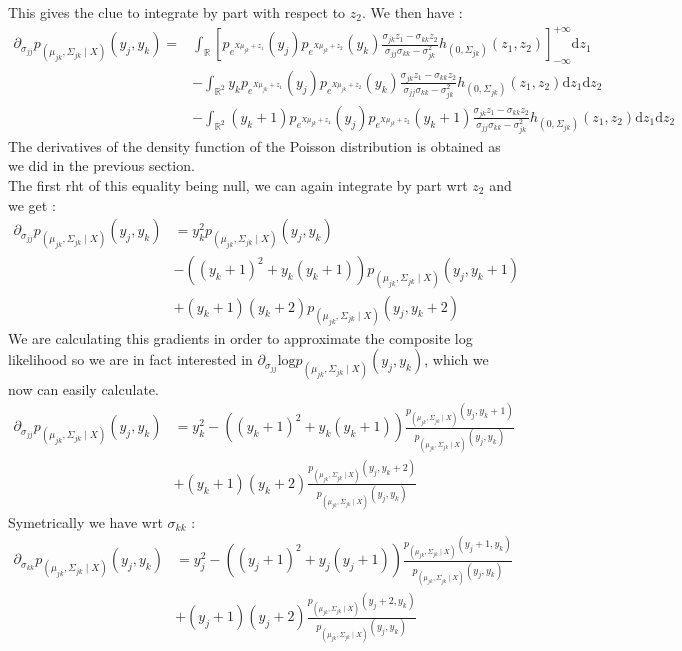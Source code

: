 \documentclass[11pt, a4paper]{article}
\begin{document}
This gives the clue to integrate by part with respect to $z_2$. We then have :
\begin{align*}
\partial_{\sigma_{jj}} p_{(\mu_{jk},\Sigma_{jk} \mid X)}(y_j,y_k) =& \int_{\mathbb{R}} [  p_{e^{X\mu_{jk}+z_1}}(y_j) p_{e^{X\mu_{jk}+z_2}}(y_k) \frac{\sigma_{jk} z_1 - \sigma_{kk} z_2}{\sigma_{jj} \sigma_{kk}-\sigma_{jk}^2} h_{(0,\Sigma_{jk})}(z_1,z_2) ]_{- \infty}^{+\infty} \mathrm{d}z_1\\
 &- \int_{\mathbb{R}^2} y_k p_{e^{X\mu_{jk}+z_1}}(y_j) p_{e^{X\mu_{jk}+z_2}}(y_k) \frac{\sigma_{jk} z_1 - \sigma_{kk} z_2}{\sigma_{jj} \sigma_{kk}-\sigma_{jk}^2} h_{(0,\Sigma_{jk})}(z_1,z_2) \mathrm{d}z_1 \mathrm{d}z_2\\
 &- \int_{\mathbb{R}^2} (y_k+1) p_{e^{X\mu_{jk}+z_1}}(y_j)  p_{e^{X\mu_{jk}+z_2}}(y_k+1) \frac{\sigma_{jk} z_1 - \sigma_{kk} z_2}{\sigma_{jj} \sigma_{kk}-\sigma_{jk}^2} h_{(0,\Sigma_{jk})}(z_1,z_2) \mathrm{d}z_1 \mathrm{d}z_2
\end{align*}
The derivatives of the density function of the Poisson distribution is obtained as we did in the previous section.\\
The first rht of this equality being null, we can again integrate by part wrt $z_2$ and we get :
\begin{align*}
\partial_{\sigma_{jj}} p_{(\mu_{jk},\Sigma_{jk} \mid X)}(y_j,y_k) &= y_k^2 p_{(\mu_{jk},\Sigma_{jk} \mid X)}(y_j,y_k)\\
& - ((y_k+1)^2 + y_k (y_k+1) ) p_{(\mu_{jk},\Sigma_{jk} \mid X)}(y_j,y_k+1) \\
& + (y_k+1)(y_k+2) p_{(\mu_{jk},\Sigma_{jk} \mid X)}(y_j,y_k+2)
\end{align*} 
We are calculating this gradients in order to approximate the composite log likelihood so we are in fact interested in $\partial_{\sigma_{jj}} \mathrm{log}p_{(\mu_{jk},\Sigma_{jk} \mid X)}(y_j,y_k)$, which we now can easily calculate.
\begin{align*}
\partial_{\sigma_{jj}} p_{(\mu_{jk},\Sigma_{jk} \mid X)}(y_j,y_k) &= y_k^2 - ((y_k+1)^2 + y_k (y_k+1) ) \frac{p_{(\mu_{jk},\Sigma_{jk} \mid X)}(y_j,y_k+1) } {p_{(\mu_{jk},\Sigma_{jk} \mid X)}(y_j,y_k)}\\
& + (y_k+1)(y_k+2)\frac{ p_{(\mu_{jk},\Sigma_{jk} \mid X)}(y_j,y_k+2)}{p_{(\mu_{jk},\Sigma_{jk} \mid X)}(y_j,y_k)}
\end{align*}
Symetrically we have wrt $\sigma_{kk}$ :
\begin{align*}
\partial_{\sigma_{kk}} p_{(\mu_{jk},\Sigma_{jk} \mid X)}(y_j,y_k) &= y_j^2 - ((y_j+1)^2 + y_j (y_j+1) ) \frac{p_{(\mu_{jk},\Sigma_{jk} \mid X)}(y_j+1,y_k) } {p_{(\mu_{jk},\Sigma_{jk} \mid X)}(y_j,y_k)}\\
& + (y_j+1)(y_j+2)\frac{ p_{(\mu_{jk},\Sigma_{jk} \mid X)}(y_j+2,y_k)}{p_{(\mu_{jk},\Sigma_{jk} \mid X)}(y_j,y_k)}
\end{align*}
\end{document}
